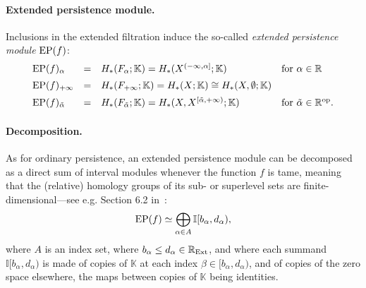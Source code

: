 \paragraph*{Extended persistence module.} 
Inclusions in the extended filtration induce the so-called {\em extended persistence module} $\mathrm{EP}(f)$:
%
\[
\begin{array}{llll}
\mathrm{EP}(f)_\alpha &=& H_*(F_\alpha;\mathbb K)=H_*(X^{(-\infty, \alpha]};\mathbb K) & \mbox{for $\alpha\in\mathbb{R}$}\\[0.5em]
\mathrm{EP}(f)_{+\infty} &=& H_*(F_{+\infty};\mathbb K)=H_*(X;\mathbb K) \cong H_*(X,\emptyset;\mathbb K)\\[0.5em]
\mathrm{EP}(f)_{\tilde\alpha} &=& H_*(F_{\tilde\alpha};\mathbb K)=H_*(X, X^{[\tilde\alpha, +\infty)};\mathbb K) & \mbox{for $\tilde\alpha\in\mathbb{R}^{\text{op}}$}.
\end{array}
\]
%



\paragraph*{Decomposition.} As for ordinary persistence, an extended persistence module can be
decomposed as a direct sum of interval modules whenever the function $f$ is tame, meaning
that the (relative) homology groups %
of its sub- or superlevel sets are finite-dimensional---see e.g. Section 6.2 in~\cite{Chazal16a}:
%
\[
\mathrm{EP}(f)\simeq\bigoplus_{\alpha\in A} \mathbb{I}[b_\alpha, d_\alpha),
\]
%
where $A$ is an index set, where $b_\alpha\leq d_\alpha\in\mathbb{R}_{\text{Ext}}$,
and where each summand $\mathbb{I}[b_\alpha, d_\alpha)$ is made of copies of $\mathbb K$ 
at each index $\beta\in [b_\alpha, d_\alpha)$, and of
copies of the zero space elsewhere, the maps between copies of $\mathbb K$ being identities. 

